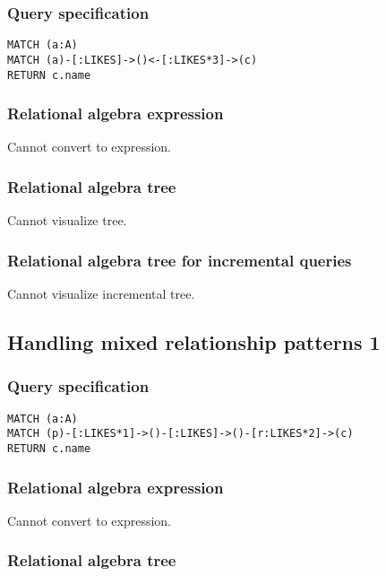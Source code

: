 \subsubsection*{Query specification}

\begin{lstlisting}
MATCH (a:A)
MATCH (a)-[:LIKES]->()<-[:LIKES*3]->(c)
RETURN c.name
\end{lstlisting}

\subsubsection*{Relational algebra expression}

Cannot convert to expression.

\subsubsection*{Relational algebra tree}

Cannot visualize tree.

\subsubsection*{Relational algebra tree for incremental queries}

Cannot visualize incremental tree.

\subsection{Handling mixed relationship patterns 1}

\subsubsection*{Query specification}

\begin{lstlisting}
MATCH (a:A)
MATCH (p)-[:LIKES*1]->()-[:LIKES]->()-[r:LIKES*2]->(c)
RETURN c.name
\end{lstlisting}

\subsubsection*{Relational algebra expression}

Cannot convert to expression.

\subsubsection*{Relational algebra tree}

